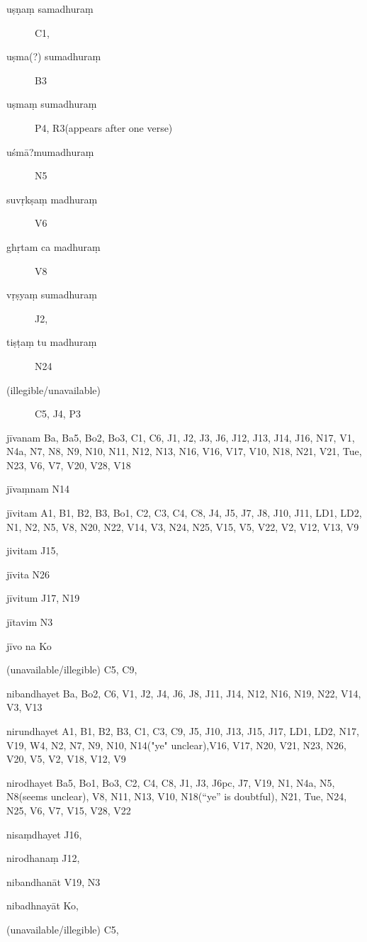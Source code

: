\begin{ekdosis}
\begin{marma}[hp01_055]
\begin{marma}[hp01_063]
\begin{description}
\item[uṣṇaṃ samadhuraṃ]        C1,
\item[uṣma(?) sumadhuraṃ]        B3
\item[uṣmaṃ sumadhuraṃ]        P4, R3(appears after one verse)
\item[uśmā?mumadhuraṃ]  N5
\item[suvṛkṣaṃ madhuraṃ]        V6
\item[ghṛtam ca madhuraṃ]        V8
\item[vṛṣyaṃ sumadhuraṃ]        J2,
\item[tiṣṭaṃ tu madhuraṃ]  N24
\item[(illegible/unavailable)]   C5, J4, P3
        \end{description}
\end{marma}


\begin{marma}[hp02_003]
\item[jīvanam] Ba, Ba5, Bo2, Bo3, C1, C6, J1, J2, J3, J6, J12, J13, J14, J16, N17, V1, N4a, N7, N8, N9, N10, N11, N12, N13, N16, V16, V17, V10, N18, N21, V21, Tue, N23, V6, V7, V20, V28, V18
\item[jīvaṃnam] N14
\item[jīvitam] A1, B1, B2, B3, Bo1, C2, C3, C4, C8, J4, J5, J7, J8, J10, J11, LD1, LD2, N1, N2, N5, V8, N20, N22, V14, V3, N24, N25, V15, V5, V22, V2, V12, V13, V9
\item[jivitam] J15,
\item[jīvita] N26
\item[jīvitum] J17, N19
\item[jītavim] N3
\item[jīvo na] Ko
\item[(unavailable/illegible)] C5, C9, 

 \begin{description}

        \end{description}
\end{marma}

\begin{marma}[hp02_003]
\item[nibandhayet] Ba, Bo2, C6, V1, J2, J4, J6, J8, J11, J14, N12, N16, N19, N22, V14, V3, V13
\item[nirundhayet] A1, B1, B2, B3, C1, C3, C9, J5, J10, J13, J15, J17, LD1, LD2, N17, V19, W4, N2, N7, N9, N10, N14("ye" unclear),V16, V17, N20, V21, N23, N26, V20, V5, V2, V18, V12, V9
\item[nirodhayet] Ba5, Bo1, Bo3, C2, C4, C8, J1, J3, J6pc, J7, V19, N1, N4a, N5, N8(seems unclear), V8, N11, N13, V10, N18(“ye” is doubtful), N21, Tue, N24, N25, V6, V7, V15, V28, V22
\item[nisaṃdhayet] J16,
\item[nirodhanaṃ] J12,
\item[nibandhanāt] V19, N3
\item[nibadhnayāt] Ko,
\item[(unavailable/illegible)] C5,
 \begin{description}


\end{description}
\end{marma}
\end{marma}
\end{ekdosis}
